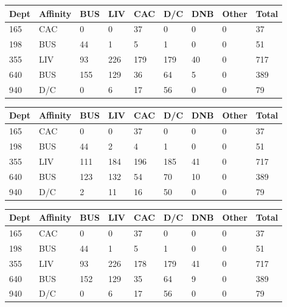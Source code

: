 \documentclass[12pt]{article}
\begin{document}
	\begin{center}
		 \label{tab:title} 
		\begin{tabular} { | l | l | l | l | l | l | l | l | l | }
			\hline
			Dept & Affinity & BUS & LIV & CAC & D/C & DNB & Other & Total \\ \hline
			165 & CAC & 0 & 0 & 37 & 0 & 0 & 0 & 37 \\ \hline
			198 & BUS & 44 & 1 & 5 & 1 & 0 & 0 & 51 \\ \hline
			355 & LIV & 93 & 226 & 179 & 179 & 40 & 0 & 717 \\ \hline
			640 & BUS & 155 & 129 & 36 & 64 & 5 & 0 & 389 \\ \hline
			940 & D/C & 0 & 6 & 17 & 56 & 0 & 0 & 79 \\ \hline
		\end{tabular}
	\end{center}

	\begin{center}
		 \label{tab:title} 
		\begin{tabular} { | l | l | l | l | l | l | l | l | l | }
			\hline
			Dept & Affinity & BUS & LIV & CAC & D/C & DNB & Other & Total \\ \hline
			165 & CAC & 0 & 0 & 37 & 0 & 0 & 0 & 37 \\ \hline
			198 & BUS & 44 & 2 & 4 & 1 & 0 & 0 & 51 \\ \hline
			355 & LIV & 111 & 184 & 196 & 185 & 41 & 0 & 717 \\ \hline
			640 & BUS & 123 & 132 & 54 & 70 & 10 & 0 & 389 \\ \hline
			940 & D/C & 2 & 11 & 16 & 50 & 0 & 0 & 79 \\ \hline
		\end{tabular}
	\end{center}

	\begin{center}
		 \label{tab:title} 
		\begin{tabular} { | l | l | l | l | l | l | l | l | l | }
			\hline
			Dept & Affinity & BUS & LIV & CAC & D/C & DNB & Other & Total \\ \hline
			165 & CAC & 0 & 0 & 37 & 0 & 0 & 0 & 37 \\ \hline
			198 & BUS & 44 & 1 & 5 & 1 & 0 & 0 & 51 \\ \hline
			355 & LIV & 93 & 226 & 178 & 179 & 41 & 0 & 717 \\ \hline
			640 & BUS & 152 & 129 & 35 & 64 & 9 & 0 & 389 \\ \hline
			940 & D/C & 0 & 6 & 17 & 56 & 0 & 0 & 79 \\ \hline
		\end{tabular}
	\end{center}
\end{document}
